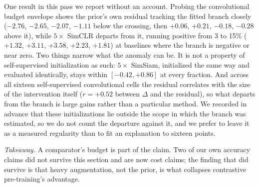One result in this pass we report without an account. Probing the
convolutional budget envelope shows the prior's own residual tracking the
fitted branch closely ($-2.76$, $-2.65$, $-2.07$, $-1.11$ below the
crossing, then $+0.06$, $+0.21$, $-0.18$, $-0.28$ above it), while
$5\times$ SimCLR departs from it, running positive from 3 to 15\%
($+1.32$, $+3.11$, $+3.58$, $+2.23$, $+1.81$) at baselines where the branch
is negative or near zero. Two things narrow what the anomaly can be. It is
not a property of self-supervised initialization as such: $5\times$
SimSiam, initialized the same way and evaluated identically, stays within
$[-0.42, +0.86]$ at every fraction. And across all sixteen self-supervised
convolutional cells the residual correlates with the size of the
intervention itself ($r = +0.52$ between $\Delta$ and the residual), so
what departs from the branch is large gains rather than a particular
method. We recorded in advance that these initializations lie outside the
scope in which the branch was estimated, so we do not count the departure
against it, and we prefer to leave it as a measured regularity than to fit
an explanation to sixteen points.

\emph{Takeaway.} A comparator's budget is part of the claim. Two of our
own accuracy claims did not survive this section and are now cost claims;
the finding that did survive is that heavy augmentation, not the prior,
is what collapses contrastive pre-training's advantage.
